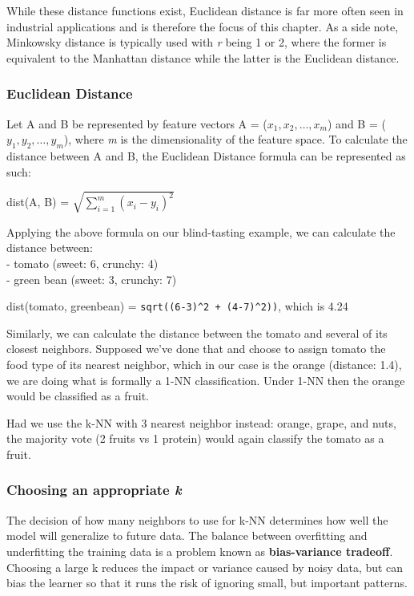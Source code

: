 \documentclass[
]{article}
\begin{document}
While these distance functions exist, Euclidean distance is far more
often seen in industrial applications and is therefore the focus of this
chapter. As a side note, Minkowsky distance is typically used with
\emph{r} being 1 or 2, where the former is equivalent to the Manhattan
distance while the latter is the Euclidean distance.

\hypertarget{euclidean-distance}{%
\subsubsection{Euclidean Distance}\label{euclidean-distance}}

Let A and B be represented by feature vectors A = (\(x_1, x_2, …, x_m\))
and B = (\(y_1, y_2, …, y_m\)), where \emph{m} is the dimensionality of
the feature space. To calculate the distance between A and B, the
Euclidean Distance formula can be represented as such:

dist(A, B) = \(\sqrt{\sum\limits^{m}_{i=1}(x_i-y_i)^2}\)

Applying the above formula on our blind-tasting example, we can
calculate the distance between:\\
- tomato (sweet: 6, crunchy: 4)\\
- green bean (sweet: 3, crunchy: 7)

dist(tomato, greenbean) = \texttt{sqrt((6-3)\^{}2\ +\ (4-7)\^{}2))},
which is 4.24

Similarly, we can calculate the distance between the tomato and several
of its closest neighbors. Supposed we've done that and choose to assign
tomato the food type of its nearest neighbor, which in our case is the
orange (distance: 1.4), we are doing what is formally a 1-NN
classification. Under 1-NN then the orange would be classified as a
fruit.

Had we use the k-NN with 3 nearest neighbor instead: orange, grape, and
nuts, the majority vote (2 fruits vs 1 protein) would again classify the
tomato as a fruit.

\hypertarget{choosing-an-appropriate-k}{%
\subsubsection{\texorpdfstring{Choosing an appropriate
\emph{k}}{Choosing an appropriate k}}\label{choosing-an-appropriate-k}}

The decision of how many neighbors to use for k-NN determines how well
the model will generalize to future data. The balance between
overfitting and underfitting the training data is a problem known as
\textbf{bias-variance tradeoff}. Choosing a large k reduces the impact
or variance caused by noisy data, but can bias the learner so that it
runs the risk of ignoring small, but important patterns.
\end{document}
